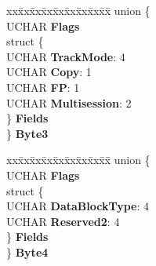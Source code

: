 \begin{DoxyCompactItemize}
\begin{tabbing}
\end{tabbing}\item 
\mbox{\label{struct___m_o_d_e___w_r_i_t_e___p_a_r_a_m_s___p_a_g_e_a44ba10648069fcd45b2820248b6ef135}} 
\begin{tabbing}
xx\=xx\=xx\=xx\=xx\=xx\=xx\=xx\=xx\=\kill
union \{\\
\>UCHAR {\bfseries Flags}\\
\>struct \{\\
\>\>UCHAR {\bfseries TrackMode}: 4\\
\>\>UCHAR {\bfseries Copy}: 1\\
\>\>UCHAR {\bfseries FP}: 1\\
\>\>UCHAR {\bfseries Multisession}: 2\\
\>\} {\bfseries Fields}\\
\} {\bfseries Byte3}\\

\end{tabbing}\item 
\mbox{\label{struct___m_o_d_e___w_r_i_t_e___p_a_r_a_m_s___p_a_g_e_a6820177f379986947568612ef1374489}} 
\begin{tabbing}
xx\=xx\=xx\=xx\=xx\=xx\=xx\=xx\=xx\=\kill
union \{\\
\>UCHAR {\bfseries Flags}\\
\>struct \{\\
\>\>UCHAR {\bfseries DataBlockType}: 4\\
\>\>UCHAR {\bfseries Reserved2}: 4\\
\>\} {\bfseries Fields}\\
\} {\bfseries Byte4}\\


\end{tabbing}
\end{DoxyCompactItemize}
